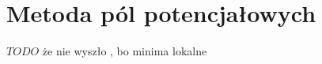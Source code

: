 \section{Metoda pól potencjałowych}
\label{ch:potential-fields}
$TODO$ że nie wyszło , bo minima lokalne